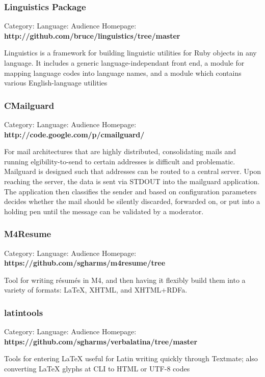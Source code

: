 \documentclass[]{article}
\begin{document}
\subsubsection*{Linguistics Package}
Category:  Language: Audience
Homepage: {\bf http://github.com/bruce/linguistics/tree/master}
\vspace{0.05in}

Linguistics is a framework for building linguistic utilities for Ruby objects
in any language. It includes a generic language-independant front end, a
module for mapping language codes into language names, and a module which
contains various English-language utilities





\subsubsection*{CMailguard}
Category:  Language: Audience
Homepage: {\bf http://code.google.com/p/cmailguard/}
\vspace{0.05in}

For mail architectures that are highly distributed, consolidating mails and running elgibility-to-send to certain addresses is difficult and problematic.  Mailguard is designed such that addresses can be routed to a central server. Upon reaching the server, the data is sent via STDOUT into the mailguard application.  The application then classifies the sender and based on configuration parameters decides whether the mail should be silently discarded, forwarded on, or put into a holding pen until the message can be validated by a moderator.




\subsubsection*{M4Resume}
Category:  Language: Audience
Homepage: {\bf https://github.com/sgharms/m4resume/tree}
\vspace{0.05in}

Tool for writing résumés in M4, and then having it flexibly build them into a variety of formats:  LaTeX, XHTML, and XHTML+RDFa.




\subsubsection*{latintools}
Category:  Language: Audience
Homepage: {\bf https://github.com/sgharms/verbalatina/tree/master}
\vspace{0.05in}

Tools for entering LaTeX useful for Latin writing quickly through Textmate; also converting LaTeX glyphs at CLI to HTML or UTF-8 codes
\end{document}
